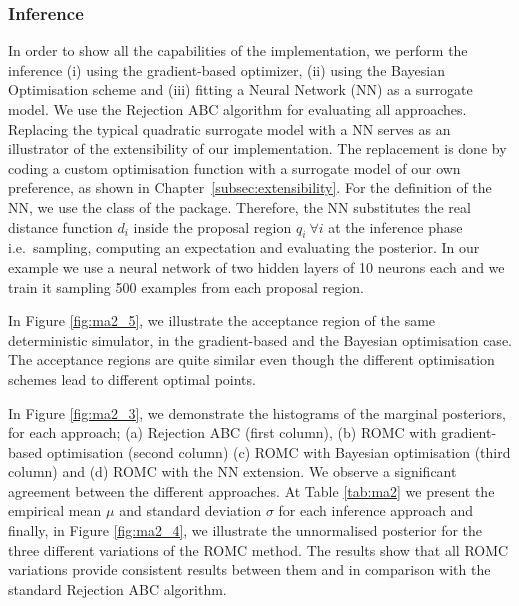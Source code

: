 \subsubsection*{Inference}

In order to show all the capabilities of the implementation, we
perform the inference (i) using the gradient-based optimizer, (ii)
using the Bayesian Optimisation scheme and (iii) fitting a Neural
Network (NN) as a surrogate model. We use the Rejection ABC algorithm
for evaluating all approaches. Replacing the typical quadratic
surrogate model with a NN serves as an illustrator of the
extensibility of our implementation. The replacement is done by coding
a custom optimisation function with a surrogate model of our own
preference, as shown in Chapter~\ref{subsec:extensibility}. For the
definition of the NN, we use the  class of the
 package. Therefore, the NN substitutes the real
distance function \(d_i\) inside the proposal region
\(q_i~ \forall i\) at the inference phase i.e.~sampling,
computing an expectation and evaluating the posterior. In our example
we use a neural network of two hidden layers of 10 neurons each and we
train it sampling 500 examples from each proposal region.

In Figure \ref{fig:ma2_5}, we illustrate the acceptance region of the
same deterministic simulator, in the gradient-based and the Bayesian
optimisation case. The acceptance regions are quite similar even though the
different optimisation schemes lead to different optimal points.

In Figure \ref{fig:ma2_3}, we demonstrate the histograms of the
marginal posteriors, for each approach; (a) Rejection ABC (first
column), (b) ROMC with gradient-based optimisation (second column) (c)
ROMC with Bayesian optimisation (third column) and (d) ROMC with the
NN extension. We observe a significant agreement between the
different approaches. At Table \ref{tab:ma2} we present the empirical
mean \(\mu\) and standard deviation \(\sigma\) for each inference
approach and finally, in Figure \ref{fig:ma2_4}, we illustrate the
unnormalised posterior for the three different variations of the ROMC
method. The results show that all ROMC variations provide consistent
results between them and in comparison with the standard Rejection ABC
algorithm.

